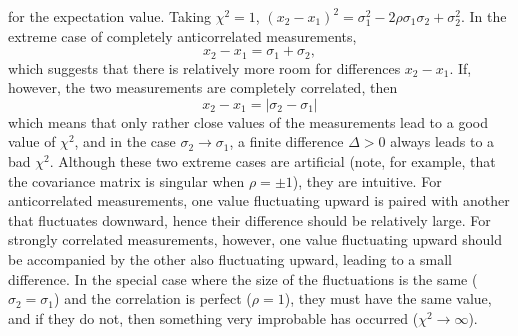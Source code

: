 \documentclass[11pt]{article}
\newcommand{\xa}   {x_1}
\newcommand{\xb}   {x_2}
\newcommand{\ua} {\sigma_{1}}
\newcommand{\ub} {\sigma_{2}}
\newcommand{\uaq} {\sigma^2_{1}}
\newcommand{\ubq} {\sigma^2_{2}}
\begin{document}
for the expectation value.  Taking $\chi^2 = 1$, 
$(\xb-\xa)^2 = \uaq - 2\rho\ua\ub + \ubq$.    In the extreme
case of completely anticorrelated measurements, 
$$
  \xb - \xa = \ua + \ub ,
$$
which suggests that there is relatively more room for
differences $\xb - \xa$.   If, however, the two measurements
are completely correlated, then
$$
  \xb - \xa = | \ub - \ua |
$$
which means that only rather close values of the measurements
lead to a good value of $\chi^2$, and in the case $\ub \rightarrow \ua$,
a finite difference $\Delta > 0$ always leads to a bad $\chi^2$.
Although these two extreme cases are artificial (note, for example,
that the covariance matrix is singular when $\rho = \pm 1$), they are intuitive.
For anticorrelated measurements, one value fluctuating upward is paired
with another that fluctuates downward, hence their difference should be
relatively large.  For strongly correlated measurements, however, one
value fluctuating upward should be accompanied by the other also fluctuating
upward, leading to a small difference.  In the special case where the
size of the fluctuations is the same ($\ub = \ua$) and the correlation is
perfect ($\rho = 1$), they must have the same value, and if they do not,
then something very improbable has occurred ($\chi^2 \rightarrow \infty$).
\end{document}

